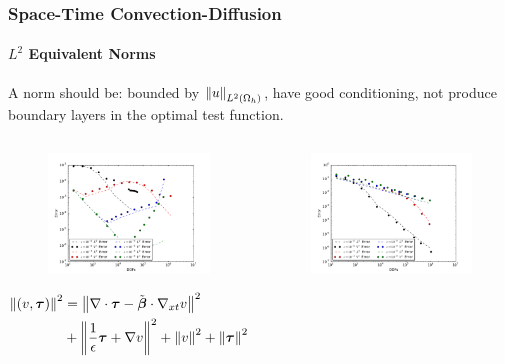 \documentclass[18pt,xcolor=table]{beamer}
\begin{document}
\begin{frame}[t]
\frametitle{Space-Time Convection-Diffusion}
\framesubtitle{$L^2$ Equivalent Norms}
A norm should be: bounded by $\left\| u \right\|_{L^2\left( \Omega_h \right)}$, have good conditioning, not produce boundary layers in the optimal test function.
\vspace{-5ex}
\begin{columns}[t]
\begin{column}{0.5\textwidth}
\begin{figure}[t]
\centering
\includegraphics[width=\textwidth]{Confusion/Robustness/convergence1D_p2_graph.pdf}
\end{figure}
\vspace{-5ex}
\small{
\begin{align*}
\left\| (v,\boldsymbol\tau) \right\|^2&=
\left\| \nabla\cdot\boldsymbol\tau-\tilde{\boldsymbol\beta}\cdot\nabla_{xt} v \right\|^2\\
&+\left\| \frac{1}{\epsilon}\boldsymbol\tau+\nabla v \right\|^2
+\left\| v \right\|^2
+\left\| \boldsymbol\tau \right\|^2
\end{align*}
}
\end{column}
\begin{column}{0.5\textwidth}
\begin{figure}[t]
\centering
\includegraphics[width=\textwidth]{Confusion/Robustness/convergence1D_p2_robust.pdf}

\end{figure}
\end{column}
\end{columns}
\end{frame}
\end{document}
